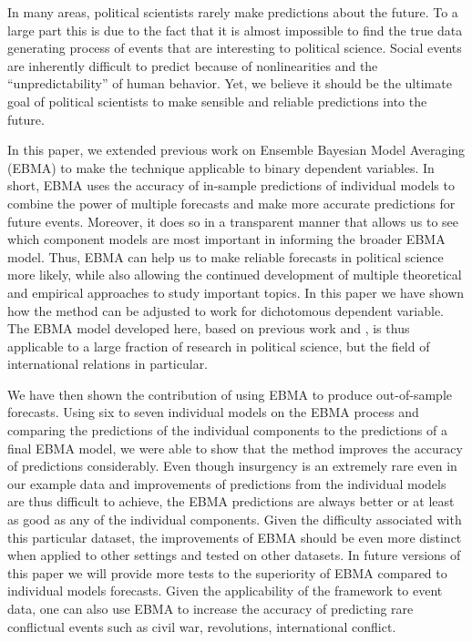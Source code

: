 \documentclass[pdftex,12pt,fullpage,oneside]{amsart}
\begin{document}
In many areas, political scientists rarely make predictions about the
future. To a large part this is due to the fact that it is almost
impossible to find the true data generating process of events that are
interesting to political science. Social events are inherently
difficult to predict because of nonlinearities and the
``unpredictability'' of human behavior. Yet, we believe it should be
the ultimate goal of political scientists to make sensible and
reliable predictions into the future.

In this paper, we extended previous work on Ensemble Bayesian Model
Averaging (EBMA) to make the technique applicable to binary dependent
variables. In short, EBMA uses the accuracy of in-sample predictions
of individual models to combine the power of multiple forecasts and
make more accurate predictions for future events.  Moreover, it does
so in a transparent manner that allows us to see which component
models are most important in informing the broader EBMA model.  Thus,
EBMA can help us to make reliable forecasts in political science more
likely, while also allowing the continued development of multiple
theoretical and empirical approaches to study important topics. In
this paper we have shown how the method can be adjusted to work for
dichotomous dependent variable.  The EBMA model developed here, based
on previous work \citet{Sloughter:2007} and \citet{Sloughter:2010}, is
thus applicable to a large fraction of research in political science,
but the field of international relations in particular. 

We have then shown the contribution of using EBMA to produce out-of-sample forecasts. Using six to seven individual models on the EBMA
process and comparing the predictions of the individual components to the
predictions of a final EBMA model, we were able to show that the
method improves the accuracy of predictions considerably. Even though
insurgency is an extremely rare even in our example data and improvements
of predictions from the individual models are thus difficult to
achieve, the EBMA predictions are always better or at least as good as any
of the individual components. Given the difficulty associated with this
particular dataset, the improvements of EBMA should be even more
distinct when applied to other settings and tested on other
datasets. In future versions of this paper we will provide more tests
to the superiority of EBMA compared to individual models forecasts.
Given the applicability of the framework to event data, one can also use
EBMA to increase the accuracy of predicting rare conflictual events
such as  civil war, revolutions, international conflict.
\end{document}
